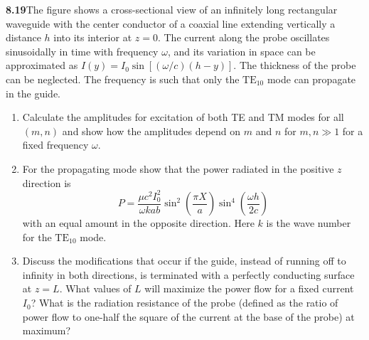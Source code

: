 \par\bigskip
\noindent\textbf{8.19}\quad The figure shows a cross-sectional view of an infinitely long rectangular waveguide with the center conductor of a coaxial line extending vertically a distance $h$ into its interior at $z=0$. The current along the probe oscillates sinusoidally in time with frequency $\omega$, and its variation in space can be approximated as $I(y)=I_{0}\sin[(\omega/c)(h-y)]$. The thickness of the probe can be neglected. The frequency is such that only the $\mathrm{TE}_{10}$ mode can propagate in the guide.

\begin{center}
\end{center}

\begin{enumerate}
\item[(a)] Calculate the amplitudes for excitation of both TE and TM modes for all $(m,n)$ and show how the amplitudes depend on $m$ and $n$ for $m,n\gg1$ for a fixed frequency $\omega$.
\item[(b)] For the propagating mode show that the power radiated in the positive $z$ direction is
\[
P=\frac{\mu c^{2}I_{0}^{2}}{\omega kab}\sin^{2}\!\left(\frac{\pi X}{a}\right)\sin^{4}\!\left(\frac{\omega h}{2c}\right)
\]
with an equal amount in the opposite direction. Here $k$ is the wave number for the $\mathrm{TE}_{10}$ mode.
\item[(c)] Discuss the modifications that occur if the guide, instead of running off to infinity in both directions, is terminated with a perfectly conducting surface at $z=L$. What values of $L$ will maximize the power flow for a fixed current $I_{0}$? What is the radiation resistance of the probe (defined as the ratio of power flow to one-half the square of the current at the base of the probe) at maximum?
\end{enumerate}
\solution

